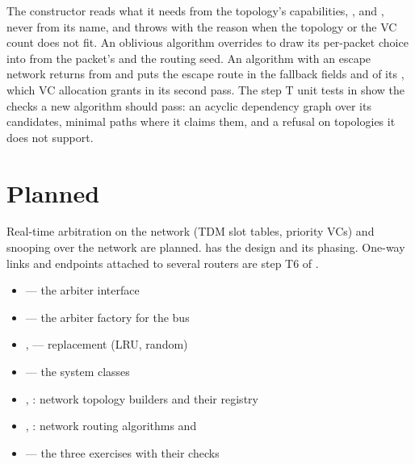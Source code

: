 The constructor reads what it needs from the topology's capabilities, ,
 and , never from its name, and throws  with the reason
when the topology or the VC count does not fit. An oblivious algorithm overrides 
to draw its per-packet choice into  from the packet's  and
the routing seed. An algorithm with an escape network returns  from
 and puts the escape route in the fallback fields  and
 of its , which VC allocation grants in its second pass. The step T
unit tests in  show the checks a new algorithm
should pass: an acyclic dependency graph over its candidates, minimal paths where it claims them,
and a refusal on topologies it does not support.

\section{Planned}

Real-time arbitration on the network (TDM slot tables, priority VCs) and snooping over the network
are planned.  has the design and its phasing. One-way links and
endpoints attached to several routers are step T6 of .
\endgroup

\begin{wherebox}
\begin{itemize}[nosep,leftmargin=1.2em]
\item {} --- the arbiter interface
\item {} --- the arbiter factory for the bus
\item {},  --- replacement (LRU, random)
\item {} --- the system classes
\item {}, : network topology builders and their registry
\item {}, : network routing algorithms and 
\item {} --- the three exercises with their checks
\end{itemize}
\end{wherebox}
